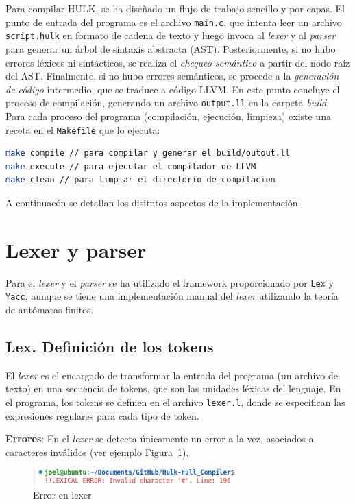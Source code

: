 \documentclass{llncs}
\begin{document}
Para compilar HULK, se ha diseñado un flujo de trabajo sencillo y por capas. El punto de entrada del programa es 
el archivo \texttt{main.c}, que intenta leer un archivo \texttt{script.hulk} en formato de cadena de texto y luego invoca al \textit{lexer} y al \textit{parser} para generar un árbol de sintaxis abstracta (AST). Posteriormente,
si no hubo errores léxicos ni sintácticos, se realiza el \textit{chequeo semántico} a partir del nodo raíz del AST. Finalmente, si no hubo errores semánticos, se procede a la \textit{generación de código} intermedio, que se traduce a código LLVM. En
este punto concluye el proceso de compilación, generando un archivo \texttt{output.ll} en la carpeta \textit{build}. Para cada proceso del programa (compilación, ejecución, limpieza) existe una receta en el \texttt{Makefile} que lo ejecuta: 
\begin{lstlisting}[language=bash]
make compile // para compilar y generar el build/outout.ll
make execute // para ejecutar el compilador de LLVM 
make clean // para limpiar el directorio de compilacion
\end{lstlisting}

A continuacón se detallan los disitntos aspectos de la implementación.
\vspace{10pt}
\section{Lexer y parser}

Para el \textit{lexer} y el \textit{parser} se ha utilizado el framework proporcionado por \texttt{Lex} y \texttt{Yacc}, aunque se tiene una implementación manual del \textit{lexer} utilizando la teoría de autómatas finitos.

\subsection{Lex. Definición de los tokens}

El \textit{lexer} es el encargado de transformar la entrada del programa (un archivo de texto) en una secuencia de tokens, que son las unidades léxicas del lenguaje. En el programa, los tokens se definen en el archivo \texttt{lexer.l}, 
donde se especifican las expresiones regulares para cada tipo de token.

\textbf{Errores}: En el \textit{lexer} se detecta únicamente un error a la vez, asociados a caracteres inválidos (ver ejemplo Figura~\ref{fig:errores_lex}).
\begin{figure}[h]
\centering
\includegraphics[width=0.7\textwidth]{images/lexer_errors.png}
\caption{Error en lexer}
\label{fig:errores_lex}
\end{figure}
\end{document}
